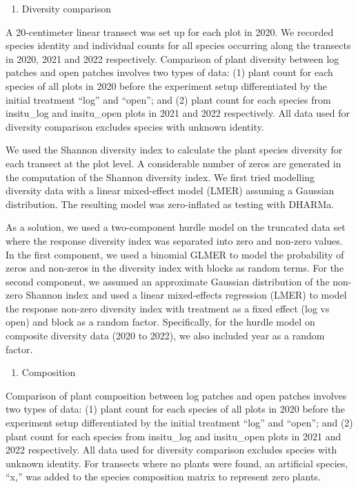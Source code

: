 \documentclass[
]{article}
\providecommand{\tightlist}{%
  \setlength{\itemsep}{0pt}\setlength{\parskip}{0pt}}
\begin{document}
\begin{enumerate}
\def\labelenumi{\arabic{enumi}.}
\setcounter{enumi}{1}
\tightlist
\item
  Diversity comparison
\end{enumerate}

A 20-centimeter linear transect was set up for each plot in 2020. We
recorded species identity and individual counts for all species
occurring along the transects in 2020, 2021 and 2022 respectively.
Comparison of plant diversity between log patches and open patches
involves two types of data: (1) plant count for each species of all
plots in 2020 before the experiment setup differentiated by the initial
treatment ``log'' and ``open''; and (2) plant count for each species
from insitu\_log and insitu\_open plots in 2021 and 2022 respectively.
All data used for diversity comparison excludes species with unknown
identity.

We used the Shannon diversity index to calculate the plant species
diversity for each transect at the plot level. A considerable number of
zeros are generated in the computation of the Shannon diversity index.
We first tried modelling diversity data with a linear mixed-effect model
(LMER) assuming a Gaussian distribution. The resulting model was
zero-inflated as testing with DHARMa.

As a solution, we used a two-component hurdle model on the truncated
data set where the response diversity index was separated into zero and
non-zero values. In the first component, we used a binomial GLMER to
model the probability of zeros and non-zeros in the diversity index with
blocks as random terms. For the second component, we assumed an
approximate Gaussian distribution of the non-zero Shannon index and used
a linear mixed-effects regression (LMER) to model the response non-zero
diversity index with treatment as a fixed effect (log vs open) and block
as a random factor. Specifically, for the hurdle model on composite
diversity data (2020 to 2022), we also included year as a random factor.

\begin{enumerate}
\def\labelenumi{\arabic{enumi}.}
\setcounter{enumi}{2}
\tightlist
\item
  Composition
\end{enumerate}

Comparison of plant composition between log patches and open patches
involves two types of data: (1) plant count for each species of all
plots in 2020 before the experiment setup differentiated by the initial
treatment ``log'' and ``open''; and (2) plant count for each species
from insitu\_log and insitu\_open plots in 2021 and 2022 respectively.
All data used for diversity comparison excludes species with unknown
identity. For transects where no plants were found, an artificial
species, ``x,'' was added to the species composition matrix to represent
zero plants.
\end{document}
